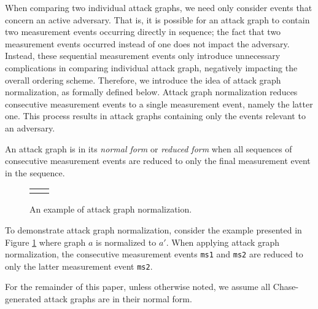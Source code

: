 \documentclass[runningheads]{llncs}
\theoremstyle{definition}
\begin{document}
When comparing two individual attack graphs, we need only consider events that concern an active adversary. That is, it is possible for an attack graph to contain two measurement events occurring directly in sequence; the fact that two measurement events occurred instead of one does not impact the adversary. Instead, these sequential measurement events only introduce unnecessary complications in comparing individual attack graph, negatively impacting the overall ordering scheme. Therefore, we introduce the idea of attack graph normalization, as formally defined below. Attack graph normalization reduces consecutive measurement events to a single measurement event, namely the latter one. This process results in attack graphs containing only the events relevant to an adversary. 

\begin{definition}
    An attack graph is in its \emph{normal form} or \emph{reduced form} when all sequences of consecutive measurement events are reduced to only the final measurement event in the sequence. 
\end{definition}

\begin{figure}[htbp]
    \centering 
    \begin{tabular}{c c}
         &  
    \end{tabular}
    \captionsetup{justification=centering,margin=1cm}
    \caption[Example of attack graph normalization]{An example of attack graph normalization.}
    \label{fig:reduce-ex}
\end{figure}
\noindent To demonstrate attack graph normalization, consider the example presented in Figure \ref{fig:reduce-ex} where graph $a$ is normalized to $a'$. When applying attack graph normalization, the consecutive measurement events \texttt{ms1} and \texttt{ms2} are reduced to only the latter measurement event \texttt{ms2}. 

For the remainder of this paper, unless otherwise noted, we assume all Chase-generated attack graphs are in their normal form.

\end{document}
